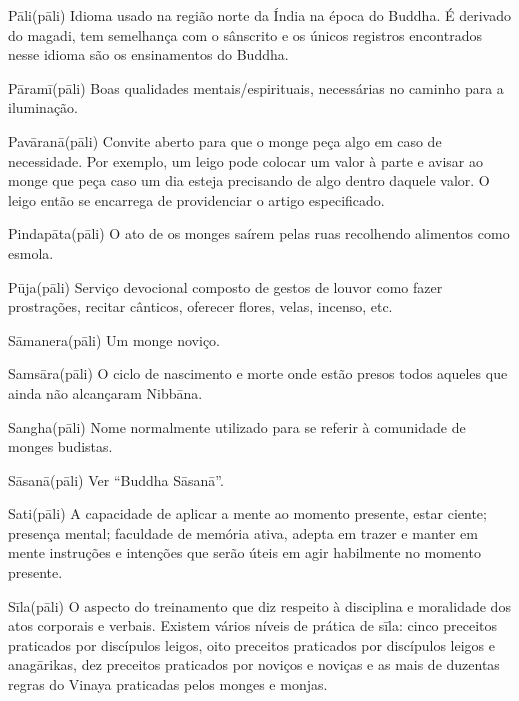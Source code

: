 \begin{glossarydescription}
\item[{{Pāli}{(pāli)}}] Idioma usado na região norte da Índia na época do Buddha. É derivado do magadi, tem semelhança com o sânscrito e os únicos registros encontrados nesse idioma são os ensinamentos do Buddha.

\item[{{Pāramī}{(pāli)}}] Boas qualidades mentais/espirituais, necessárias no caminho para a iluminação.

\item[{{Pavāranā}{(pāli)}}] Convite aberto para que o monge peça algo em caso de necessidade. Por exemplo, um leigo pode colocar um valor à parte e avisar ao monge que peça caso um dia esteja precisando de algo dentro daquele valor. O leigo então se encarrega de providenciar o artigo especificado.

\item[{{Pindapāta}{(pāli)}}] O ato de os monges saírem pelas ruas recolhendo alimentos como esmola.

\item[{{Pūja}{(pāli)}}] Serviço devocional composto de gestos de louvor como fazer prostrações, recitar cânticos, oferecer flores, velas, incenso, etc.

\item[{{Sāmanera}{(pāli)}}] Um monge noviço.

\item[{{Samsāra}{(pāli)}}] O ciclo de nascimento e morte onde estão presos todos aqueles que ainda não alcançaram Nibbāna.

\item[{{Sangha}{(pāli)}}] Nome normalmente utilizado para se referir à comunidade de monges budistas.

\item[{{Sāsanā}{(pāli)}}] Ver ``Buddha Sāsanā''.

\item[{{Sati}{(pāli)}}] A capacidade de aplicar a mente ao momento presente, estar ciente; presença mental; faculdade de memória ativa, adepta em trazer e manter em mente instruções e intenções que serão úteis em agir habilmente no momento presente.

\item[{{Sīla}{(pāli)}}] O aspecto do treinamento que diz respeito à disciplina e moralidade dos atos corporais e verbais. Existem vários níveis de prática de sīla: cinco preceitos praticados por discípulos leigos, oito preceitos praticados por discípulos leigos e anagārikas, dez preceitos praticados por noviços e noviças e as mais de duzentas regras do Vinaya praticadas pelos monges e monjas.


\end{glossarydescription}
